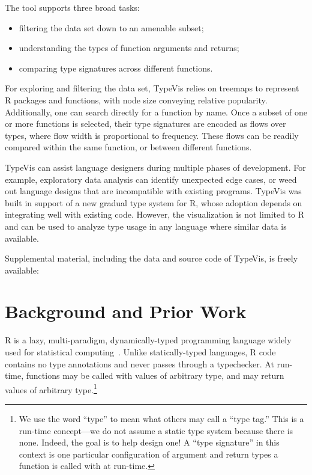 \documentclass{vgtc}                          %
\newcommand{\typevis}{{\sc TypeVis}\xspace}
\begin{document}
The tool supports three broad tasks:
\begin{itemize}
  \setlength\itemsep{0em}
  \item filtering the data set down to an amenable subset;
  \item understanding the types of function arguments and returns;
  \item comparing type signatures across different functions.
\end{itemize}
For exploring and filtering the data set,
\typevis relies on treemaps to represent R packages and functions,
with node size conveying relative popularity.
Additionally, one can search directly for a function by name.
Once a subset of one or more functions is selected,
their type signatures are encoded as flows over types,
where flow width is proportional to frequency.
These flows can be readily compared within the same function,
or between different functions.

\typevis can assist language designers during multiple phases of development.
For example, exploratory data analysis can identify unexpected edge cases,
or weed out language designs that are incompatible with existing programs.
\typevis was built in support of a new gradual type system for R,
whose adoption depends on integrating well with existing code.
However, the visualization is not limited to R and can be used to
analyze type usage in any language where similar data is available.

Supplemental material, including the data and source code of
\typevis, is freely available: 


\section{Background and Prior Work}

R is a lazy, multi-paradigm, dynamically-typed programming language
widely used for statistical computing~\cite{morandat:2012}.
Unlike statically-typed languages,
R code contains no type annotations
and never passes through a typechecker.
At run-time,
functions may be called with values of arbitrary type,
and may return values of arbitrary type.\footnote{
  We use the word ``type'' to mean what others may call a ``type tag.''
  This is a run-time concept---we do not assume a static type system
  because there is none. Indeed, the goal is to help design one!
  A ``type signature'' in this context is one particular configuration
  of argument and return types a function is called with at run-time.
}
\end{document}
